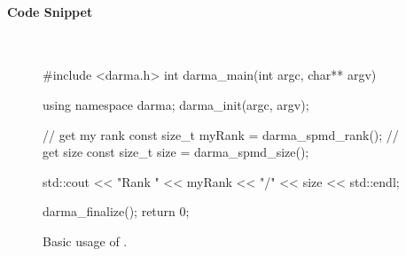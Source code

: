 \paragraph{Code Snippet}\mbox{}\\ 
\begin{figure}[!h]
\begin{CppCodeNumb}
#include <darma.h>
int darma_main(int argc, char** argv)
{
  using namespace darma;
  darma_init(argc, argv);

  // get my rank
  const size_t myRank = darma_spmd_rank();
  // get size 
  const size_t size = darma_spmd_size();

  std::cout << "Rank " << myRank << "/" << size << std::endl;

  darma_finalize();
  return 0;
}
\end{CppCodeNumb}
\label{fig:fe_api_ranksize}
\caption{Basic usage of \protect{}.}
\end{figure}


